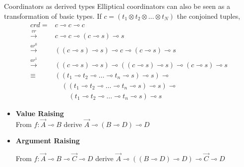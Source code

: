 \documentclass{beamer}
\newcommand{\li}{\!\multimap\!}
\newcommand{\lotimes}{\!\otimes\!}
\begin{document}
\begin{frame}{Coordinators as derived types}
	\small
	Elliptical coordinators can also be seen as a transformation of basic types.
	If $c = (t_1 \lotimes t_2 \lotimes \dots \lotimes t_N)$ the conjoined tuples,
	\begin{align*}
		crd = &c \li c \li c\\
		\overset{vr}{\rightarrow} & c\li c \li (c\li s) \li s\\
		\overset{ar^0}{\rightarrow} & \left( \left(c\li s\right) \li s \right) \li c \li (c\li s) \li s\\
		\overset{ar^1}{\rightarrow} & \left( \left(c\li s\right) \li s \right) \li \left( \left(c\li s\right) \li s \right) \li (c\li s) \li s\\
		\equiv &\left(\left( t_1 \li t_2 \li \dots \li t_n \li s \right) \li s \right) \li \\
		& \quad \left(\left( t_1 \li t_2 \li \dots \li t_n \li s \right) \li s \right) \li \\
		& \quad\quad \left( t_1 \li t_2 \li \dots \li t_n \li s \right) \li s
	\end{align*}
	\vfill
	\begin{itemize}
		\item \textbf{Value Raising}\\
			{\footnotesize
			From $f: \vec{A}\li B$ derive $\vec{A} \li (B\li D) \li D$
			}
		\item \textbf{Argument Raising}\\
			\begin{footnotesize}
			From $f: \vec{A}\li B \li \vec{C}\li D$ derive $\vec{A}\li ((B\li D)\li D) \li \vec{C} \li D$							\end{footnotesize}
	\end{itemize}
\end{frame}

	\newcommand{\posimpl}{\overset{+}{\multimap}}
	\newcommand{\negimpl}{\overset{-}{\multimap}}
	\newcommand{\posat}[1]{\overset{+}{\proofspace#1}}
	\newcommand{\negat}[1]{\overset{-}{\proofspace#1}}
	\newcommand{\proofspace}{\vphantom{()}}
\end{document}
